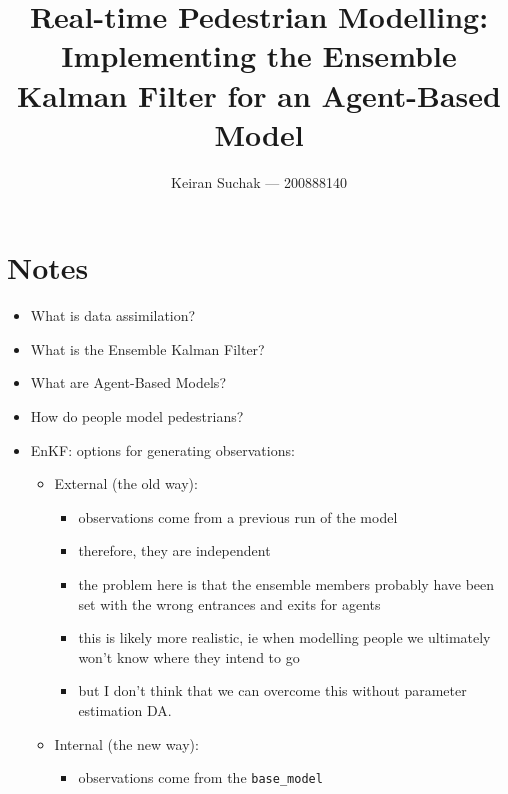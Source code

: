 \documentclass[12pt, twoside, a4paper]{report}
\begin{document}
\title{Real-time Pedestrian Modelling: Implementing the Ensemble Kalman Filter
for an Agent-Based Model}
\author{Keiran Suchak --- 200888140}
\maketitle


\tableofcontents
\listoffigures
\listoftables

\chapter*{Notes}

\begin{itemize}
    \item What is data assimilation?
    \item What is the Ensemble Kalman Filter?
    \item What are Agent-Based Models?
    \item How do people model pedestrians?
    \item EnKF: options for generating observations:
        \begin{itemize}
            \item External (the old way):
                \begin{itemize}
                    \item observations come from a previous run of the model
                    \item therefore, they are independent
                    \item the problem here is that the ensemble members probably
                        have been set with the wrong entrances and exits for
                        agents
                    \item this is likely more realistic, ie when modelling
                        people we ultimately won't know where they intend to go
                    \item but I don't think that we can overcome this without
                        parameter estimation DA.
                \end{itemize}
            \item Internal (the new way):
                \begin{itemize}
                    \item observations come from the \texttt{base\_model}

\end{itemize}
\end{itemize}
\end{itemize}
\end{document}
